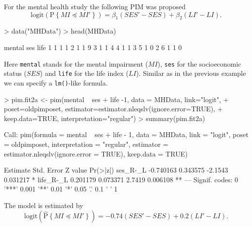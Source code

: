 \documentclass[12pt]{article}
\newcommand{\prob}[1]{\text{P}\left\{#1\right\}}
\newcommand{\hatprob}[1]{\hat{\text{P}}\left\{#1\right\}}
\newcommand{\leqs}{\preccurlyeq}
\begin{document}
For the mental health study the following PIM was proposed
\begin{equation}\label{pim.mhs}
\text{logit}\left(\prob{MI \leqs MI'} \right) = \beta_1 (SES' - SES) + \beta_2 (LI' - LI). 
\end{equation}
\begin{Schunk}
\begin{Sinput}
> data("MHData")
> head(MHData)
\end{Sinput}
\begin{Soutput}
  mental ses life
1      1   1    1
2      1   1    9
3      1   1    4
4      1   1    3
5      1   0    2
6      1   1    0
\end{Soutput}
\end{Schunk}
Here \verb|mental| stands for the mental impairment ($MI$), \verb|ses| for the socioeconomic status ($SES$) and \verb|life| for the life index ($LI$). Similar as in the previous example we can specify a \texttt{lm()}-like formula. 
\begin{Schunk}
\begin{Sinput}
> pim.fit2a <- pim(mental ~ ses + life -1, data = MHData, link="logit", 
+   poset=oldpimposet, estimator=estimator.nleqslv(ignore.error=TRUE), 
+   keep.data=TRUE, interpretation="regular")
> summary(pim.fit2a)
\end{Sinput}
\begin{Soutput}
Call:
pim(formula = mental ~ ses + life - 1, data = MHData, link = "logit", 
    poset = oldpimposet, interpretation = "regular", estimator = estimator.nleqslv(ignore.error = TRUE), 
    keep.data = TRUE)

           Estimate Std. Error Z value Pr(>|z|)   
ses_R-_L  -0.740163   0.343575 -2.1543 0.031217 * 
life_R-_L  0.201179   0.073371  2.7419 0.006108 **
---
Signif. codes:  0 '***' 0.001 '**' 0.01 '*' 0.05 '.' 0.1 ' ' 1 
\end{Soutput}
\end{Schunk}
The model is estimated by
\[
\text{logit}\left(\hatprob{MI \leqs MI'} \right) = -0.74 (SES' - SES) + 0.2 (LI' - LI). 
\]
\end{document}
